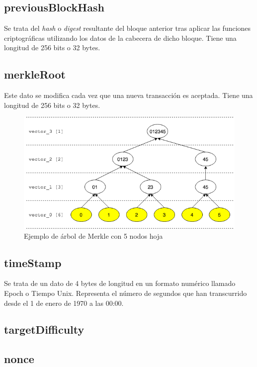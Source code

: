 \documentclass{article}
\begin{document}
    \subsection{previousBlockHash}
    Se trata del \textit{hash} o \textit{digest} resultante del bloque anterior tras aplicar las funciones criptográficas utilizando los datos de la cabecera de dicho bloque. Tiene una longitud de 256 bits o 32 bytes.
    
    \subsection{merkleRoot}
    Este dato se modifica cada vez que una nueva transacción es aceptada. Tiene una longitud de 256 bits o 32 bytes.
    
    \begin{figure}[H]
    \centering
        \includegraphics[scale=0.55]{img/Merkle_tree_05_leaves_nodes}
        \caption{Ejemplo de árbol de Merkle con 5 nodos hoja}
    \end{figure}
    
    \subsection{timeStamp}
    Se trata de un dato de 4 bytes de longitud en un formato numérico llamado Epoch o Tiempo Unix. Representa el número de segundos que han transcurrido desde el 1 de enero de 1970 a las 00:00. 
    
    \subsection{targetDifficulty}
    
    \subsection{nonce}
    
\end{document}
